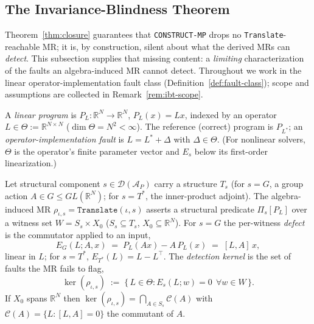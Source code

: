 
\subsection{The Invariance-Blindness Theorem}
\label{subsec:ibt}

Theorem~\ref{thm:closure} guarantees that \texttt{CONSTRUCT-MP} drops no
\texttt{Translate}-reachable MR; it is, by construction, silent about what the
derived MRs can \emph{detect}. This subsection supplies that missing content: a
\emph{limiting} characterization of the faults an algebra-induced MR cannot
detect. Throughout we work in the linear operator-implementation fault class
(Definition~\ref{def:fault-class}); scope and assumptions are collected in
Remark~\ref{rem:ibt-scope}.

\begin{definition}
\label{def:fault-class}
A \emph{linear program} is $P_L:\mathbb{R}^N\to\mathbb{R}^N$, $P_L(x)=Lx$, indexed by an
operator $L\in\Theta:=\mathbb{R}^{N\times N}$ ($\dim\Theta=N^2<\infty$). The reference
(correct) program is $P_{L^{*}}$; an \emph{operator-implementation fault} is
$L=L^{*}+\Delta$ with $\Delta\in\Theta$. (For nonlinear solvers, $\Theta$ is the
operator's finite parameter vector and $E_s$ below its first-order linearization.)
\end{definition}

\begin{definition}
\label{def:defect-kernel}
Let structural component $s\in\mathcal{D}(\mathcal{A}_P)$ carry a structure $T_s$ (for $s=G$, a group
action $A\in G\le GL(\mathbb{R}^N)$; for $s=T^{*}$, the inner-product adjoint). The
algebra-induced MR $\rho_{\iota,s}=\texttt{Translate}(\iota,s)$ asserts a structural
predicate $\Pi_s[P_L]$ over a witness set $W=S_s\times X_0$ ($S_s\subseteq T_s$,
$X_0\subseteq\mathbb{R}^N$). For $s=G$ the per-witness \emph{defect} is the commutator
applied to an input,
\[
E_G(L;A,x)\;=\;P_L(Ax)-A\,P_L(x)\;=\;[L,A]\,x,
\]
linear in $L$; for $s=T^{*}$, $E_{T^{*}}(L)=L-L^{\top}$. The \emph{detection kernel}
is the set of faults the MR fails to flag,
\[
\ker(\rho_{\iota,s})\;:=\;\{\,L\in\Theta : E_s(L;w)=0\ \ \forall w\in W\,\}.
\]
If $X_0$ spans $\mathbb{R}^N$ then $\ker(\rho_{\iota,s})=\bigcap_{A\in S_s}\mathcal{C}(A)$
with $\mathcal{C}(A)=\{L:[L,A]=0\}$ the commutant of $A$.
\end{definition}

